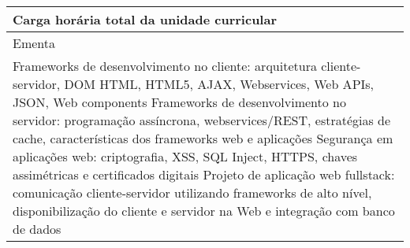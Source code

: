 \begin{quadro}[ht!]
\begin{tabular}{|p{3cm} p{2cm} p{3cm} p{2cm} p{3cm} p{2cm}|}
\multicolumn{5}{|p{13cm}|}{\cellcolor{blue1} Carga horária total da unidade curricular} & \multicolumn{1}{p{1cm}|}{\raggedleft 60	}\\\hline
\multicolumn{6}{|p{15cm}|}{\cellcolor{blue1} Ementa} \\\hline
\hline\multicolumn{6}{|p{15cm}|}{\scriptsize Frameworks de desenvolvimento no cliente: arquitetura cliente-servidor, DOM HTML, HTML5, AJAX, Webservices, Web APIs, JSON, Web components Frameworks de desenvolvimento no servidor: programação assíncrona, webservices/REST, estratégias de cache, características dos frameworks web e aplicações Segurança em aplicações web: criptografia, XSS, SQL Inject, HTTPS, chaves assimétricas e certificados digitais Projeto de aplicação web fullstack: comunicação cliente-servidor utilizando frameworks de alto nível, disponibilização do cliente e servidor na Web e integração com banco de dados}\\\hline
\hline
	\end{tabular}
\end{quadro}
